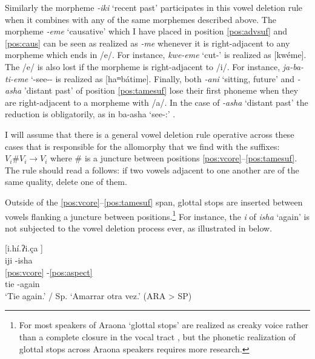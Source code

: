 \documentclass[output=paper,hidelinks]{langscibook}
\begin{document}
Similarly the morpheme \textit{-iki} `recent past' participates in this vowel deletion rule when it combines with any of the same morphemes described above. 
The morpheme \textit{-eme} `causative' which I have placed in position \ref{pos:advsuf} and \ref{pos:caus} can be seen as realized as \textit{-me} whenever it is right-adjacent to any morpheme which ends in /e/. For instance, \textit{kwe-eme} `cut-\Caus{}' is realized as [kwéme]. The /e/ is also lost if the morpheme is right-adjacent to /i/. For instance, \textit{ja-ba-ti-eme} `\Intrc{}-see-\Intrc{}-\Caus{} is realized as [haᵐbátime].
Finally, both \textit{-ani} `sitting, future' and \textit{-asha} 'distant past' of position \ref{pos:tamesuf} lose their first phoneme when they are right-adjacent to a morpheme with /a/. In the case of \textit{-asha} `distant past' the reduction is obligatorily, as in ba-asha `see-\Dist{}:\Pst{}' \rightarrow [ᵐbáça].


I will assume that there is a general vowel deletion rule operative across these cases that is responsible for the allomorphy that we find with the suffixes: $V{_i}\#V{_i} \rightarrow V{_i}$ where \# is a juncture between positions \ref{pos:vcore}--\ref{pos:tamesuf}. The rule should read a follows: if two vowels adjacent to one another are of the same quality, delete one of them.

Outside of the \ref{pos:vcore}--\ref{pos:tamesuf} span, glottal stops are inserted between vowels flanking a juncture between positions.\footnote{For most speakers of Araona `glottal stops' are realized as creaky voice rather than a complete closure in the vocal tract \citep{GordonLadefoged:2001, garellek:2013}, but the phonetic realization of glottal stops across Araona speakers requires more research.}  For instance, the \textit{i} of \textit{isha} `again' is not subjected to the vowel deletion process ever, as illustrated in  below.

\ea \label{ex:iji-isha}
    [i.hí.ʔi.ça \downarrow] \\
    \glll iji -isha   \\ 
    \ref{pos:vcore} -\ref{pos:aspect}        \\
    tie -again    \\
    \glt `Tie again.' / Sp. `Amarrar otra vez.'  \hfill (ARA > SP)
\z 

\end{document}
